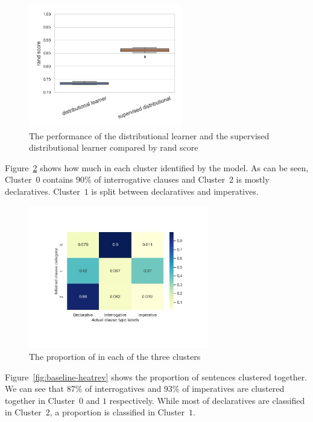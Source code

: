 \begin{figure}[H]
    \centering
    \includegraphics[width=0.6\textwidth]{figures/dist-compare-rand.jpg}
    \caption{The performance of the distributional learner and the supervised distributional learner compared by rand score }
    \label{fig:dist-compare-rand}
\end{figure}


Figure~\ref{fig:baseline-heatmap} shows how much \diis{} in each cluster identified by the model. As can be seen, Cluster~$0$ contains 90\% of interrogative clauses and Cluster~$2$ is mostly declaratives. Cluster~$1$ is split between declaratives and imperatives.

\begin{figure}[H]
    \centering
    \includegraphics[width=0.7\textwidth]{figures/baseline-heatmap.jpg}
    \caption{The proportion of \diis{} in each of the three clusters}
    \label{fig:baseline-heatmap}
\end{figure}

Figure~\ref{fig:baseline-heatrev} shows the proportion of sentences clustered together. We can see that 87\% of interrogatives and 93\% of imperatives are clustered together in Cluster~$0$ and $1$ respectively. While most of declaratives are classified in Cluster~$2$, a proportion is classified in Cluster~$1$.

